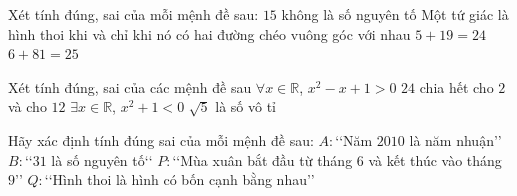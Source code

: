 \begin{ex}%
	Xét tính đúng, sai của  mỗi mệnh đề sau:
	 \choiceTF
		 {$15$ không là số nguyên tố}
		{Một tứ giác là hình thoi  khi và chỉ khi nó có hai đường chéo vuông góc với nhau}
		{\True $5+19=24$} 
		 {$6+81=25$}
\end{ex}

\begin{ex}%
	Xét tính đúng, sai của các mệnh đề  sau
	 \choiceTF
		{\True $\forall x  \in \mathbb{R}$, $x^{2}-x+1>0$}
		{\True $24$ chia hết cho $2$ và  cho $12$}
		{$\exists x \in \mathbb{R}$, $x^{2}+1<0$} 
		 {\True $\sqrt{5}$ là số vô tỉ}
\end{ex}

\begin{ex}%
	Hãy xác định tính đúng sai của mỗi mệnh  đề sau:
	\choiceTF 
		{$A\colon$\lq\lq Năm $2010$  là năm nhuận\rq\rq}
		{\True $B\colon$\lq\lq $31$ là số nguyên  tố\lq\lq}
		{$P\colon$\lq\lq Mùa xuân bắt đầu từ tháng $6$ và kết thúc vào  tháng $9$\rq\rq}
		{\True $Q\colon$\lq\lq Hình thoi là hình  có bốn cạnh bằng nhau\rq\rq}
\end{ex}

